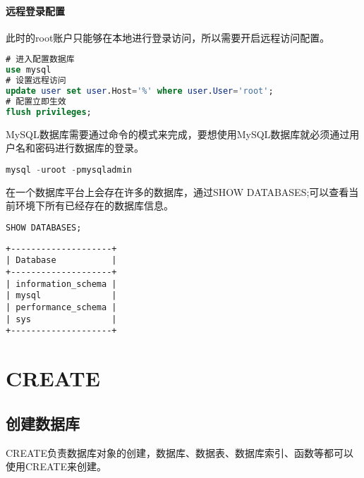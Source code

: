 \documentclass[12pt, openany, oneside]{book}
\begin{document}
\subsubsection{远程登录配置}

此时的root账户只能够在本地进行登录访问，所以需要开启远程访问配置。\\


\begin{lstlisting}[language=SQL]
# 进入配置数据库
use mysql
# 设置远程访问
update user set user.Host='%' where user.User='root';
# 配置立即生效
flush privileges;
\end{lstlisting}

MySQL数据库需要通过命令的模式来完成，要想使用MySQL数据库就必须通过用户名和密码进行数据库的登录。\\


\begin{lstlisting}[language=SQL]
mysql -uroot -pmysqladmin
\end{lstlisting}

在一个数据库平台上会存在许多的数据库，通过SHOW DATABASES;可以查看当前环境下所有已经存在的数据库信息。\\


\begin{lstlisting}[language=SQL]
SHOW DATABASES;
\end{lstlisting}

\begin{tcolorbox}
	\begin{verbatim}
+--------------------+
| Database           |
+--------------------+
| information_schema |
| mysql              |
| performance_schema |
| sys                |
+--------------------+
	\end{verbatim}
\end{tcolorbox}

\newpage

\chapter{CREATE}

\section{创建数据库}

CREATE负责数据库对象的创建，数据库、数据表、数据库索引、函数等都可以使用CREATE来创建。\\
\end{document}
